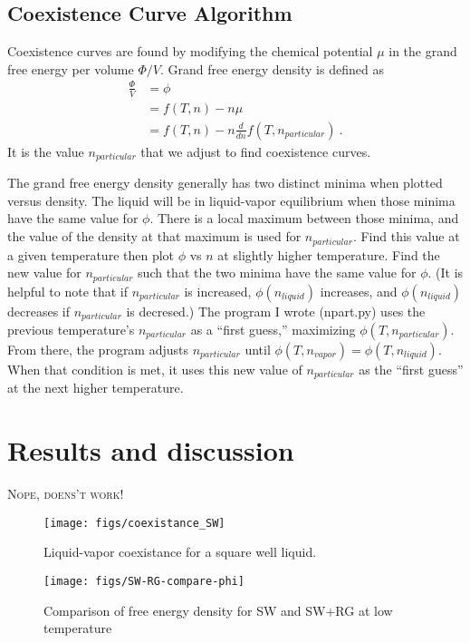 \documentclass[letterpaper,twocolumn,amsmath,amssymb,prb]{revtex4-1}
\newcommand{\npart}{n_{particular}}
\newcommand{\nliq}{n_{liquid}}
\newcommand{\nvap}{n_{vapor}}
\begin{document}
\subsection{Coexistence Curve Algorithm}
Coexistence curves are found by modifying the chemical potential $\mu$
in the grand free energy per volume $\Phi/V$. Grand free energy
density is defined as
\begin{align}
  \frac{\Phi}{V} &= \phi \nonumber \\
                 &= f(T,n) - n\mu \nonumber \\
                 &= f(T,n) - n\frac{d}{dn}f(T,\npart)\ .
\end{align}
It is the value $\npart$ that we adjust to find coexistence curves.

The grand free energy density generally has two distinct minima when
plotted versus density. The liquid will be in liquid-vapor equilibrium
when those minima have the same value for $\phi$. There is a local
maximum between those minima, and the value of the density at that
maximum is used for $\npart$. Find this value at a given temperature
then plot $\phi$ vs $n$ at slightly higher temperature. Find the new
value for $\npart$ such that the two minima have the same value for
$\phi$. (It is helpful to note that if $\npart$ is increased,
$\phi(\nliq)$ increases, and $\phi(\nliq)$ decreases if $\npart$ is
decresed.) The program I wrote (npart.py) uses the previous
temperature's $\npart$ as a ``first guess,'' maximizing
$\phi(T,\npart)$. From there, the program adjusts $\npart$
until $\phi(T,\nvap) = \phi(T,\nliq)$. When that condition is met, it
uses this new value of $\npart$ as the ``first guess'' at the next
higher temperature.

\section{Results and discussion}

\textsc{Nope, doens't work!}

\begin{figure}
  \begin{center}
  \texttt{[image: figs/coexistance\_SW]}
  \end{center}
  \caption{Liquid-vapor coexistance for a square well liquid.}
  \label{fig:coexistance_SW}
\end{figure}

\begin{figure}
  \begin{center}
  \texttt{[image: figs/SW-RG-compare-phi]}
  \end{center}
  \caption{Comparison of free energy density for SW and SW+RG at low temperature}
  \label{fig:SW-RG-compare-loT}
\end{figure}
\end{document}
